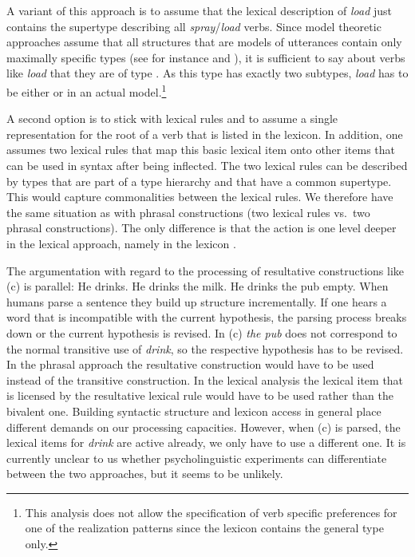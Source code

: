 \begin{exe}
\begin{xlist}[iv.]
\begin{exe}
\begin{xlist}[iv.]
A variant of this approach is to assume that the lexical description of \emph{load} just contains
the supertype describing all \emph{spray}/\emph{load} verbs. Since model theoretic approaches
assume that all structures that are models of utterances contain only maximally specific types (see
for instance  and ), it is sufficient to say about verbs like
\emph{load} that they are of type . As this type has exactly two subtypes,
\emph{load} has to be either  or  in an actual model.\footnote{
  This analysis does not allow the specification of verb specific preferences for one of the realization
  patterns since the lexicon contains the general type only.
}

A second option is to stick with lexical rules and to assume a single representation for the root of
a verb that is listed in the lexicon. In addition, one assumes two lexical rules that map this basic
lexical item onto other items that can be used in syntax after being inflected. The two lexical
rules can be described by types that are part of a type hierarchy and that have a common
supertype. This would capture commonalities between the lexical rules. We therefore have the same
situation as with phrasal constructions (two lexical rules vs.\ two phrasal constructions). The only
difference is that the action is one level deeper in the lexical approach, namely in the lexicon \citep[--406]{Mueller2002b}. 

The argumentation with regard to the processing of resultative constructions like (c) is parallel:
\eal
\ex He drinks.
\ex He drinks the milk.
\ex He drinks the pub empty.
\zl
When humans parse a sentence they build up structure incrementally. If one hears a word that is
incompatible with the current hypothesis, the parsing process breaks down or the current hypothesis
is revised. In (c) \emph{the pub} does not correspond to the normal transitive use of
\emph{drink}, so the respective hypothesis has to be revised. In the phrasal approach the resultative
construction would have to be used instead of the transitive construction. In the lexical analysis
the lexical item that is licensed by the resultative lexical rule would have to be used rather than
the bivalent one. Building syntactic structure and lexicon access in general place different
demands on our processing capacities. However, when (c) is parsed, the lexical items for
\emph{drink} are active already, we only have to use a different one. It is currently unclear to us
whether psycholinguistic experiments can differentiate between the two approaches, but it seems to
be unlikely.



\end{xlist}
\end{exe}
\end{xlist}
\end{exe}
